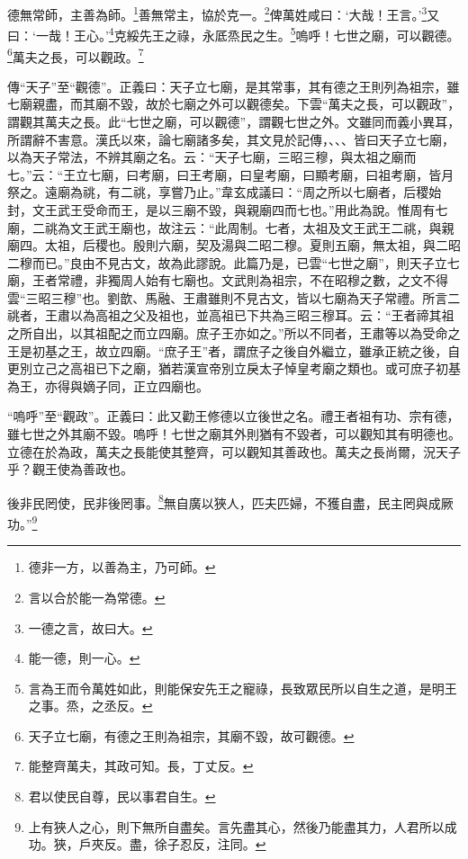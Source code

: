 德無常師，主善為師。\footnote{德非一方，以善為主，乃可師。}善無常主，協於克一。\footnote{言以合於能一為常德。}俾萬姓咸曰：‘大哉！王言。’\footnote{一德之言，故曰大。}又曰：‘一哉！王心。’\footnote{能一德，則一心。}克綏先王之祿，永厎烝民之生。\footnote{言為王而令萬姓如此，則能保安先王之寵祿，長致眾民所以自生之道，是明王之事。烝，之丞反。}嗚呼！七世之廟，可以觀德。\footnote{天子立七廟，有德之王則為祖宗，其廟不毀，故可觀德。}萬夫之長，可以觀政。\footnote{能整齊萬夫，其政可知。長，丁丈反。}


{\noindent\zhuan{}\fzbyks 傳“天子”至“觀德”。正義曰：天子立七廟，是其常事，其有德之王則列為祖宗，雖七廟親盡，而其廟不毀，故於七廟之外可以觀德矣。下雲“萬夫之長，可以觀政”，謂觀其萬夫之長。此“七世之廟，可以觀德”，謂觀七世之外。文雖同而義小異耳，所謂辭不害意。漢氏以來，論七廟諸多矣，其文見於記傳，、、、皆曰天子立七廟，以為天子常法，不辨其廟之名。云：“天子七廟，三昭三穆，與太祖之廟而七。”云：“王立七廟，曰考廟，曰王考廟，曰皇考廟，曰顯考廟，曰祖考廟，皆月祭之。遠廟為祧，有二祧，享嘗乃止。”韋玄成議曰：“周之所以七廟者，后稷始封，文王武王受命而王，是以三廟不毀，與親廟四而七也。”用此為說。惟周有七廟，二祧為文王武王廟也，故注云：“此周制。七者，太祖及文王武王二祧，與親廟四。太祖，后稷也。殷則六廟，契及湯與二昭二穆。夏則五廟，無太祖，與二昭二穆而已。”良由不見古文，故為此謬說。此篇乃是，已雲“七世之廟”，則天子立七廟，王者常禮，非獨周人始有七廟也。文武則為祖宗，不在昭穆之數，之文不得雲“三昭三穆”也。劉歆、馬融、王肅雖則不見古文，皆以七廟為天子常禮。所言二祧者，王肅以為高祖之父及祖也，並高祖已下共為三昭三穆耳。云：“王者禘其祖之所自出，以其祖配之而立四廟。庶子王亦如之。”所以不同者，王肅等以為受命之王是初基之王，故立四廟。“庶子王”者，謂庶子之後自外繼立，雖承正統之後，自更別立己之高祖已下之廟，猶若漢宣帝別立戾太子悼皇考廟之類也。或可庶子初基為王，亦得與嫡子同，正立四廟也。 \par}

{\noindent\shu{}\fzkt “嗚呼”至“觀政”。正義曰：此又勸王修德以立後世之名。禮王者祖有功、宗有德，雖七世之外其廟不毀。嗚呼！七世之廟其外則猶有不毀者，可以觀知其有明德也。立德在於為政，萬夫之長能使其整齊，可以觀知其善政也。萬夫之長尚爾，況天子乎？觀王使為善政也。 \par}

後非民罔使，民非後罔事。\footnote{君以使民自尊，民以事君自生。}無自廣以狹人，匹夫匹婦，不獲自盡，民主罔與成厥功。”\footnote{上有狹人之心，則下無所自盡矣。言先盡其心，然後乃能盡其力，人君所以成功。狹，戶夾反。盡，徐子忍反，注同。}

